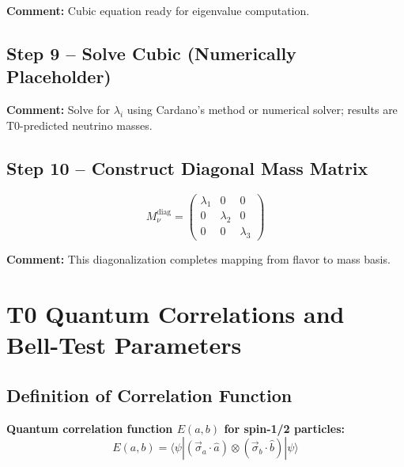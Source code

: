\documentclass[12pt,a4paper]{article}
\begin{document}
\textbf{Comment:} Cubic equation ready for eigenvalue computation.

\subsection{Step 9 – Solve Cubic (Numerically Placeholder)}

\textbf{Comment:} Solve for $\lambda_i$ using Cardano's method or numerical solver; results are T0-predicted neutrino masses.

\subsection{Step 10 – Construct Diagonal Mass Matrix}

\begin{equation}
	M_\nu^{\text{diag}} =
	\begin{pmatrix}
		\lambda_1 & 0 & 0 \\
		0 & \lambda_2 & 0 \\
		0 & 0 & \lambda_3
	\end{pmatrix}
\end{equation}

\textbf{Comment:} This diagonalization completes mapping from flavor to mass basis.
\section{T0 Quantum Correlations and Bell-Test Parameters}

\subsection{Definition of Correlation Function}

\textbf{Quantum correlation function $E(a,b)$ for spin-1/2 particles:}
\begin{equation}
	E(a,b) = \langle \psi | (\vec{\sigma}_a \cdot \hat{a}) \otimes (\vec{\sigma}_b \cdot \hat{b}) | \psi \rangle
\end{equation}
\end{document}
